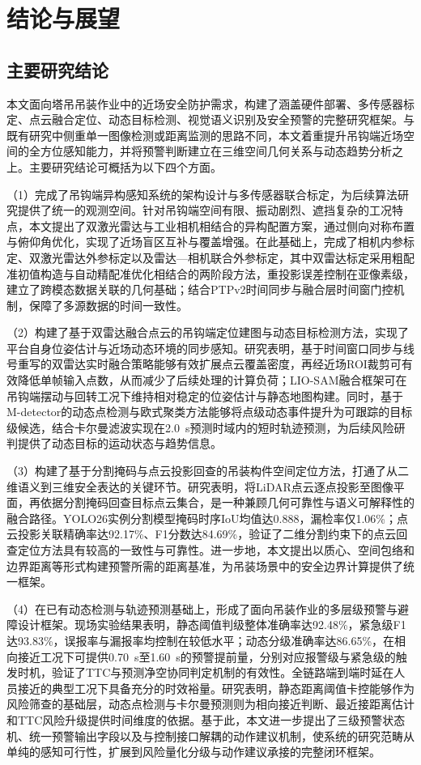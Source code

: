\chapter{结论与展望}\label{chap7_conclusion_outlook}

\section{主要研究结论}\label{sec_ch7_conclusion}

本文面向塔吊吊装作业中的近场安全防护需求，构建了涵盖硬件部署、多传感器标定、点云融合定位、动态目标检测、视觉语义识别及安全预警的完整研究框架。与既有研究中侧重单一图像检测或距离监测的思路不同，本文着重提升吊钩端近场空间的全方位感知能力，并将预警判断建立在三维空间几何关系与动态趋势分析之上。主要研究结论可概括为以下四个方面。

（1）完成了吊钩端异构感知系统的架构设计与多传感器联合标定，为后续算法研究提供了统一的观测空间。针对吊钩端空间有限、振动剧烈、遮挡复杂的工况特点，本文提出了双激光雷达与工业相机相结合的异构配置方案，通过侧向对称布置与俯仰角优化，实现了近场盲区互补与覆盖增强。在此基础上，完成了相机内参标定、双激光雷达外参标定以及雷达—相机联合外参标定，其中双雷达标定采用粗配准初值构造与自动精配准优化相结合的两阶段方法，重投影误差控制在亚像素级，建立了跨模态数据关联的几何基础；结合PTPv2时间同步与融合层时间窗门控机制，保障了多源数据的时间一致性。

（2）构建了基于双雷达融合点云的吊钩端定位建图与动态目标检测方法，实现了平台自身位姿估计与近场动态环境的同步感知。研究表明，基于时间窗口同步与线号重写的双雷达实时融合策略能够有效扩展点云覆盖密度，再经近场ROI裁剪可有效降低单帧输入点数，从而减少了后续处理的计算负荷；LIO-SAM融合框架可在吊钩端摆动与回转工况下维持相对稳定的位姿估计与静态地图构建。同时，基于M-detector的动态点检测与欧式聚类方法能够将点级动态事件提升为可跟踪的目标级候选，结合卡尔曼滤波实现在2.0~s预测时域内的短时轨迹预测，为后续风险研判提供了动态目标的运动状态与趋势信息。

（3）构建了基于分割掩码与点云投影回查的吊装构件空间定位方法，打通了从二维语义到三维安全表达的关键环节。研究表明，将LiDAR点云逐点投影至图像平面，再依据分割掩码回查目标点云集合，是一种兼顾几何可靠性与语义可解释性的融合路径。YOLO26实例分割模型掩码时序IoU均值达0.888，漏检率仅1.06\%；点云投影关联精确率达92.17\%、F1分数达84.69\%，验证了二维分割约束下的点云回查定位方法具有较高的一致性与可靠性。进一步地，本文提出以质心、空间包络和边界距离等形式构建预警所需的距离基准，为吊装场景中的安全边界计算提供了统一框架。

（4）在已有动态检测与轨迹预测基础上，形成了面向吊装作业的多层级预警与避障设计框架。现场实验结果表明，静态阈值判级整体准确率达92.48\%，紧急级F1达93.83\%，误报率与漏报率均控制在较低水平；动态分级准确率达86.65\%，在相向接近工况下可提供0.70~s至1.60~s的预警提前量，分别对应报警级与紧急级的触发时机，验证了TTC与预测净空协同判定机制的有效性。全链路端到端时延在人员接近的典型工况下具备充分的时效裕量。研究表明，静态距离阈值卡控能够作为风险筛查的基础层，动态点检测与卡尔曼预测则为相向接近判断、最近接距离估计和TTC风险升级提供时间维度的依据。基于此，本文进一步提出了三级预警状态机、统一预警输出字段以及与控制接口解耦的动作建议机制，使系统的研究范畴从单纯的感知可行性，扩展到风险量化分级与动作建议承接的完整闭环框架。

